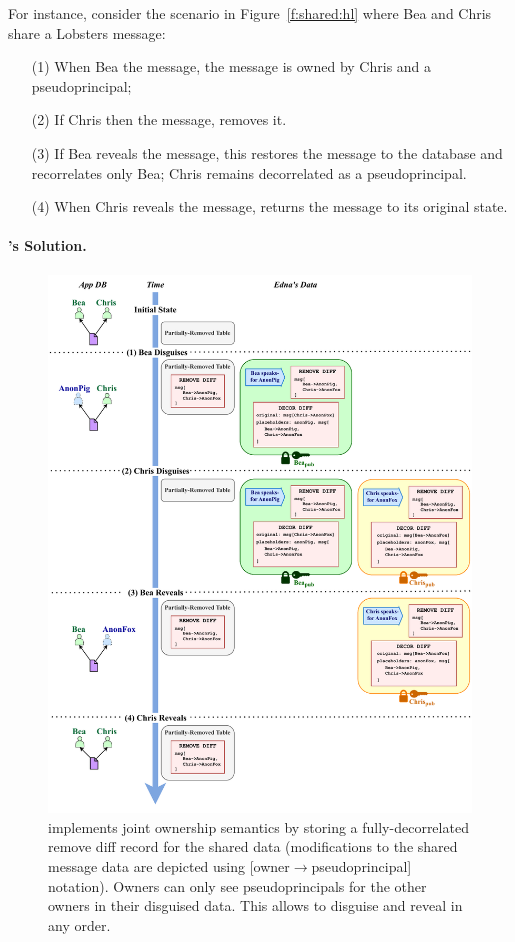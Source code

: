 %
For instance, consider the scenario in Figure~\ref{f:shared:hl} where Bea and
Chris share a Lobsters message:
\begin{enumerate}[nosep]
    \item[(1)] When Bea \xxs the message, the message is owned by
Chris and a pseudoprincipal;
    \item[(2)] If Chris then \xxs the message, \sys removes it.
    \item[(3)] If Bea reveals the message, this restores the message to the database
and recorrelates only Bea; Chris remains decorrelated as a pseudoprincipal.
\item[(4)] When Chris reveals the message, \sys returns
the message to its original state.
\end{enumerate}
%

%
\paragraph{\sys's Solution.}

\begin{figure}
    \centering
    \includegraphics[width=\textwidth]{figs/shared_data}
    \caption[\sys implements disguising of shared data using
    pseudoprincipals and diff records.]{\sys implements joint ownership
    semantics by storing a fully-decorrelated remove diff record for the shared data (modifications to the shared
    message data are depicted using 
    [owner$\to$pseudoprincipal] notation). Owners can only see
    pseudoprincipals for the other owners in their disguised data. This allows
    \sys to disguise and reveal in any order.}
\label{f:shared:data}
\end{figure}

